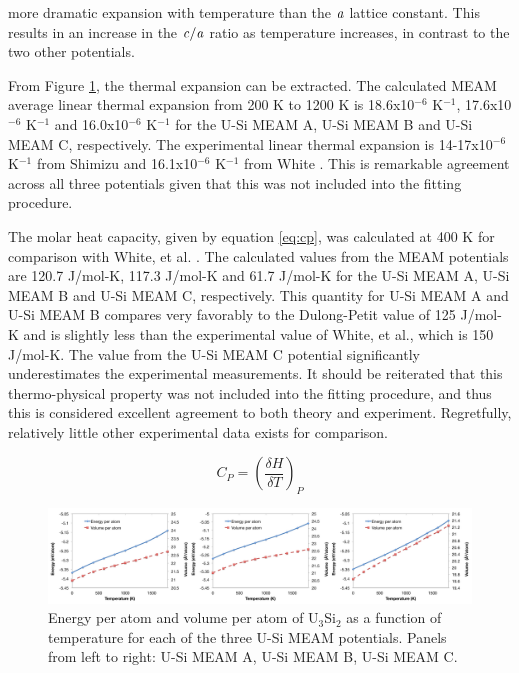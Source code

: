 \documentclass[review]{elsarticle}
\begin{document}
more dramatic expansion with temperature than the $\it{a}$ lattice constant.  This results in an increase in the $\it{c/a}$ ratio as temperature increases, in contrast to the two other potentials.  

From Figure \ref{fig:temp}, the thermal expansion can be extracted.  The calculated MEAM average linear thermal expansion from 200 K to 1200 K is 18.6x10$^{-6}$ K$^{-1}$, 17.6x10$^{-6}$ K$^{-1}$ and 16.0x10$^{-6}$ K$^{-1}$ for the U-Si MEAM A, U-Si MEAM B and U-Si MEAM C, respectively.  The experimental linear thermal expansion is 14-17x10$^{-6}$ K$^{-1}$ from Shimizu \cite{shimizu1965} and 16.1x10$^{-6}$ K$^{-1}$ from White \cite{white2015}.  This is remarkable agreement across all three potentials given that this was not included into the fitting procedure.  

The molar heat capacity, given by equation \ref{eq:cp}, was calculated at 400 K for comparison with White, et al. \cite{white2015}.  The calculated values from the MEAM potentials are 120.7 J/mol-K, 117.3 J/mol-K and  61.7 J/mol-K for the U-Si MEAM A, U-Si MEAM B and U-Si MEAM C, respectively.  This quantity for U-Si MEAM A and U-Si MEAM B compares very favorably to the Dulong-Petit value of 125 J/mol-K and is slightly less than the experimental value of White, et al., which is 150 J/mol-K.  The value from the U-Si MEAM C potential significantly underestimates the experimental measurements.  It should be reiterated that this thermo-physical property was not included into the fitting procedure, and thus this is considered excellent agreement to both theory and experiment.  Regretfully, relatively little other experimental data exists for comparison.  

\begin{equation}
\label{eq:cp}
C_{P} = \left(\frac{\delta H}{\delta T}\right)_{P}
\end{equation}

 \begin{figure}[hbt]
	\centering
	\includegraphics[width=\textwidth]{u3si2temp3.png}
    \caption{Energy per atom and volume per atom of U$_{3}$Si$_{2}$ as a function of temperature for each of the three U-Si MEAM potentials.  Panels from left to right: U-Si MEAM A, U-Si MEAM B, U-Si MEAM C.}\label{fig:temp}
\end{figure}
\end{document}
